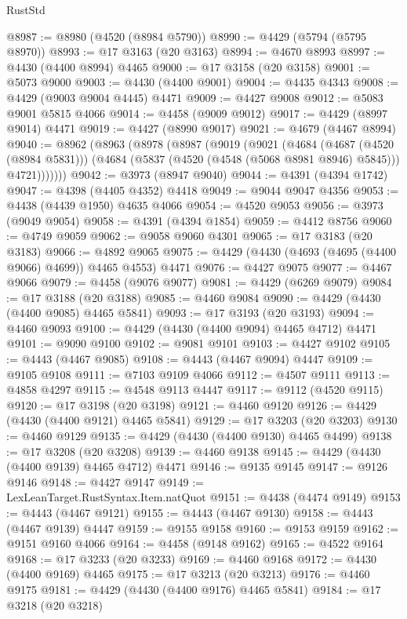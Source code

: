 \begin{lexlean}{RustStd}
\begin{coremodule}
{\begin{coremodule}
{{{{{{{{{{{{{{{{{{{{{{{{{{{{{{{{{{{{{{{{{{{{{{{{{{{{{{{{{{{{{{{{{{{{@8987 := @8980 (@4520 (@8984 @5790))
@8990 := @4429 (@5794 (@5795 @8970))
@8993 := @17 @3163 (@20 @3163)
@8994 := @4670 @8993
@8997 := @4430 (@4400 @8994) @4465
@9000 := @17 @3158 (@20 @3158)
@9001 := @5073 @9000
@9003 := @4430 (@4400 @9001)
@9004 := @4435 @4343
@9008 := @4429 (@9003 @9004 @4445) @4471
@9009 := @4427 @9008
@9012 := @5083 @9001 @5815 @4066
@9014 := @4458 (@9009 @9012)
@9017 := @4429 (@8997 @9014) @4471
@9019 := @4427 (@8990 @9017)
@9021 := @4679 (@4467 @8994)
@9040 := @8962
    (@8963
      (@8978
        (@8987
          (@9019
            (@9021
              (@4684
                (@4687 (@4520 (@8984 @5831)))
                (@4684 (@5837 (@4520 (@4548 (@5068 @8981 @8946) @5845))) @4721)))))))
@9042 := @3973 (@8947 @9040)
@9044 := @4391 (@4394 @1742)
@9047 := @4398 (@4405 @4352) @4418
@9049 := @9044 @9047 @4356
@9053 := @4438 (@4439 @1950) @4635 @4066
@9054 := @4520 @9053
@9056 := @3973 (@9049 @9054)
@9058 := @4391 (@4394 @1854)
@9059 := @4412 @8756
@9060 := @4749 @9059
@9062 := @9058 @9060 @4301
@9065 := @17 @3183 (@20 @3183)
@9066 := @4892 @9065
@9075 := @4429 (@4430 (@4693 (@4695 (@4400 @9066) @4699)) @4465 @4553) @4471
@9076 := @4427 @9075
@9077 := @4467 @9066
@9079 := @4458 (@9076 @9077)
@9081 := @4429 (@6269 @9079)
@9084 := @17 @3188 (@20 @3188)
@9085 := @4460 @9084
@9090 := @4429 (@4430 (@4400 @9085) @4465 @5841)
@9093 := @17 @3193 (@20 @3193)
@9094 := @4460 @9093
@9100 := @4429 (@4430 (@4400 @9094) @4465 @4712) @4471
@9101 := @9090 @9100
@9102 := @9081 @9101
@9103 := @4427 @9102
@9105 := @4443 (@4467 @9085)
@9108 := @4443 (@4467 @9094) @4447
@9109 := @9105 @9108
@9111 := @7103 @9109 @4066
@9112 := @4507 @9111
@9113 := @4858 @4297
@9115 := @4548 @9113 @4447
@9117 := @9112 (@4520 @9115)
@9120 := @17 @3198 (@20 @3198)
@9121 := @4460 @9120
@9126 := @4429 (@4430 (@4400 @9121) @4465 @5841)
@9129 := @17 @3203 (@20 @3203)
@9130 := @4460 @9129
@9135 := @4429 (@4430 (@4400 @9130) @4465 @4499)
@9138 := @17 @3208 (@20 @3208)
@9139 := @4460 @9138
@9145 := @4429 (@4430 (@4400 @9139) @4465 @4712) @4471
@9146 := @9135 @9145
@9147 := @9126 @9146
@9148 := @4427 @9147
@9149 := LexLeanTarget.RustSyntax.Item.natQuot
@9151 := @4438 (@4474 @9149)
@9153 := @4443 (@4467 @9121)
@9155 := @4443 (@4467 @9130)
@9158 := @4443 (@4467 @9139) @4447
@9159 := @9155 @9158
@9160 := @9153 @9159
@9162 := @9151 @9160 @4066
@9164 := @4458 (@9148 @9162)
@9165 := @4522 @9164
@9168 := @17 @3233 (@20 @3233)
@9169 := @4460 @9168
@9172 := @4430 (@4400 @9169) @4465
@9175 := @17 @3213 (@20 @3213)
@9176 := @4460 @9175
@9181 := @4429 (@4430 (@4400 @9176) @4465 @5841)
@9184 := @17 @3218 (@20 @3218)
}}}}}}}}}}}}}}}}}}}}}}}}}}}}}}}}}}}}}}}}}}}}}}}}}}}}}}}}}}}}}}}}}}}}
\end{coremodule}}
\end{coremodule}
\end{lexlean}
